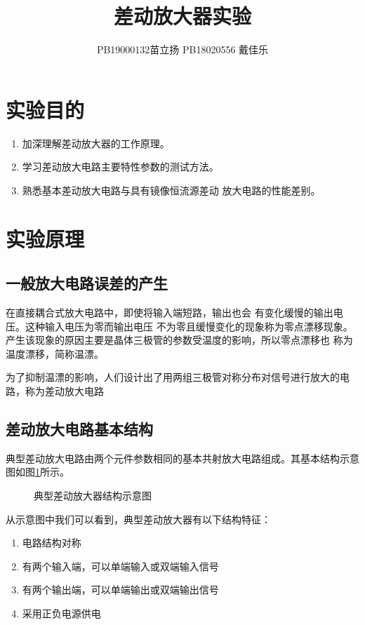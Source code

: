 \documentclass[a4paper,11pt,UTF8]{ctexart}
\title{差动放大器实验}
\author{PB19000132苗立扬  PB18020556 戴佳乐}
\begin{document}
	
	\maketitle
	\section{实验目的}
	
	\begin{enumerate}
		\item 加深理解差动放大器的工作原理。
		\item 学习差动放大电路主要特性参数的测试方法。
		\item 熟悉基本差动放大电路与具有镜像恒流源差动
		放大电路的性能差别。

	\end{enumerate}
	
	\section{实验原理}
	\subsection{一般放大电路误差的产生}
	在直接耦合式放大电路中，即使将输入端短路，输出也会
	有变化缓慢的输出电压。这种输入电压为零而输出电压
	不为零且缓慢变化的现象称为零点漂移现象。产生该现象的原因主要是晶体三极管的参数受温度的影响，所以零点漂移也
	称为温度漂移，简称温漂。
	
	为了抑制温漂的影响，人们设计出了用两组三极管对称分布对信号进行放大的电路，称为差动放大电路
	\subsection{差动放大电路基本结构}
	典型差动放大电路由两个元件参数相同的基本共射放大电路组成。其基本结构示意图如图\ref{fig:stru}所示。
	\begin{figure}[H]
		\centering
		\caption{典型差动放大器结构示意图}
		\label{fig:stru}
	\end{figure}
	从示意图中我们可以看到，典型差动放大器有以下结构特征：
	\begin{enumerate}
		\item	电路结构对称
		\item 	有两个输入端，可以单端输入或双端输入信号
		\item	有两个输出端，可以单端输出或双端输出信号
		\item	采用正负电源供电
	\end{enumerate}
	
\end{document}
